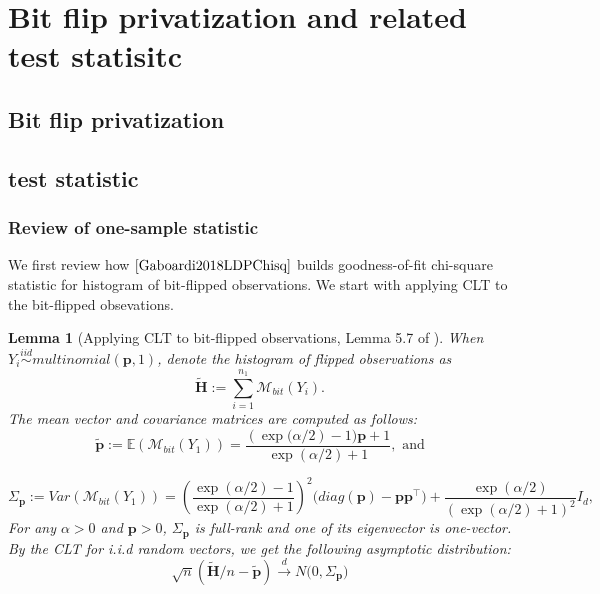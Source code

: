 \documentclass[11pt]{article} %
\newtheorem{lemma}{Lemma}[section]
\begin{document}
\section{Bit flip privatization and related test statisitc}
\subsection{Bit flip privatization}
\subsection{test statistic}
\subsubsection{Review of one-sample statistic}
We first review how $\cite{Gaboardi2018LDPChisq}$ builds goodness-of-fit chi-square statistic for  histogram of bit-flipped observations.
We start with applying CLT to the bit-flipped obsevations. 
\begin{lemma}[Applying CLT to bit-flipped observations, Lemma 5.7 of \cite{Gaboardi2018LDPChisq}]\label{lemma_57}
When $Y_i \stackrel{iid}{\sim} multinomial(\boldsymbol{p}, 1)$, denote the histogram of flipped observations as
\begin{equation}
	\tilde{\boldsymbol{H}}:= \sum_{i=1}^{n_1} \mathcal{M}_{bit}(Y_i).
\end{equation}
The mean vector and covariance matrices are computed as follows: 
\begin{equation}
	\tilde{\boldsymbol{p}}:=	
	\mathbb{E}(\mathcal{M}_{bit}(Y_1))
	=
	\frac{(\exp
		\bigl(
		\alpha/2)-1
		\bigr) \boldsymbol{p}+1}{\exp(\alpha/2)+1}, \text{ and}
\end{equation}

\begin{equation}
	\Sigma_{\boldsymbol{p}}
	:=
	Var(\mathcal{M}_{bit}(Y_1))
	=
	\left(
	\frac{\exp(\alpha/2)-1}{\exp(\alpha/2)+1}
	\right)^2
	\bigl(
	diag(\boldsymbol{p}) - \boldsymbol{p}\boldsymbol{p}^\top
	\bigr)
	+
	\frac{\exp(\alpha/2)}{(\exp(\alpha/2)+1)^2}
	I_d,
\end{equation}
For any $\alpha >0$ and $\boldsymbol{p} >0$, $\Sigma_{\boldsymbol{p}}$ is full-rank  and one of its eigenvector is one-vector. 
By the CLT for i.i.d random vectors, we get the following asymptotic distribution:
\begin{equation}\label{CLT_onesample_vector}
	\sqrt{n}(\tilde{\boldsymbol{H}}/n - \tilde{\boldsymbol{p}})
	\stackrel{d}{\to}
	N
	\bigl(
	0, \Sigma_{\boldsymbol{p}}
	\bigr)
\end{equation}
\end{lemma}
\end{document}
